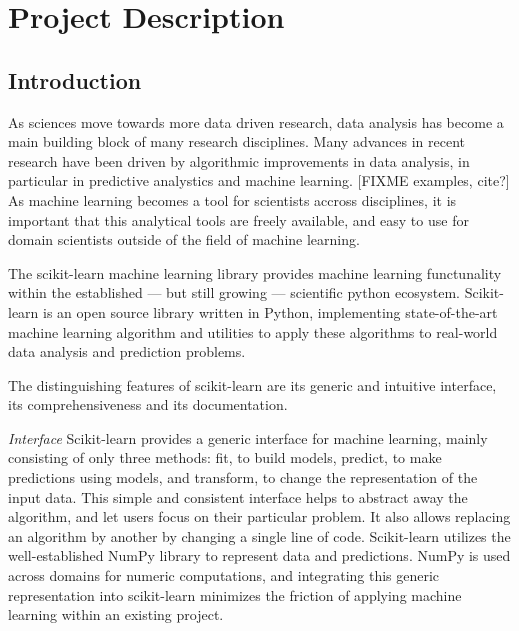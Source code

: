 




\section{Project Description}
\subsection{Introduction}
As sciences move towards more data driven research, data analysis has
become a main building block of many research disciplines.
Many advances in recent research have been driven by algorithmic improvements
in data analysis, in particular in predictive analystics and machine learning.
[FIXME examples, cite?]
As machine learning becomes a tool for scientists accross disciplines, it is
important that this analytical tools are freely available, and easy to use for
domain scientists outside of the field of machine learning.


The scikit-learn machine learning library provides machine learning functunality
within the established --- but still growing --- scientific python ecosystem.
Scikit-learn is an open source library written in Python, implementing state-of-the-art
machine learning algorithm and utilities to apply these algorithms to real-world
data analysis and prediction problems.

The distinguishing features of scikit-learn are its generic and intuitive
interface, its comprehensiveness and its documentation.

\emph{Interface} Scikit-learn provides a generic interface for machine learning, mainly consisting
of only three methods: fit, to build models, predict, to make predictions using models,
and transform, to change the representation of the input data.
This simple and consistent interface helps to abstract away the algorithm, and let
users focus on their particular problem. It also allows replacing an algorithm by another
by changing a single line of code.
Scikit-learn utilizes the well-established NumPy library to represent data and predictions.
NumPy is used across domains for numeric computations, and integrating this generic
representation into scikit-learn minimizes the friction of applying machine learning
within an existing project.

